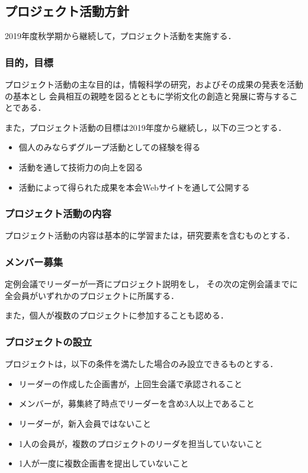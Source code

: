 \subsection*{プロジェクト活動方針}

2019年度秋学期から継続して，プロジェクト活動を実施する．

\subsubsection*{目的，目標}
プロジェクト活動の主な目的は，情報科学の研究，およびその成果の発表を活動の基本とし
会員相互の親睦を図るとともに学術文化の創造と発展に寄与することである．

また，プロジェクト活動の目標は2019年度から継続し，以下の三つとする．

\begin{itemize}
\item 個人のみならずグループ活動としての経験を得る
\item 活動を通して技術力の向上を図る
\item 活動によって得られた成果を本会Webサイトを通して公開する
\end{itemize}


\subsubsection*{プロジェクト活動の内容}
プロジェクト活動の内容は基本的に学習または，研究要素を含むものとする．

\subsubsection*{メンバー募集}
定例会議でリーダーが一斉にプロジェクト説明をし，
その次の定例会議までに全会員がいずれかのプロジェクトに所属する．

また，個人が複数のプロジェクトに参加することも認める．

\subsubsection*{プロジェクトの設立}
プロジェクトは，以下の条件を満たした場合のみ設立できるものとする．

\begin{itemize}
\item リーダーの作成した企画書が，上回生会議で承認されること
\item メンバーが，募集終了時点でリーダーを含め3人以上であること
\item リーダーが，新入会員ではないこと
\item 1人の会員が，複数のプロジェクトのリーダを担当していないこと
\item 1人が一度に複数企画書を提出していないこと
\end{itemize}

